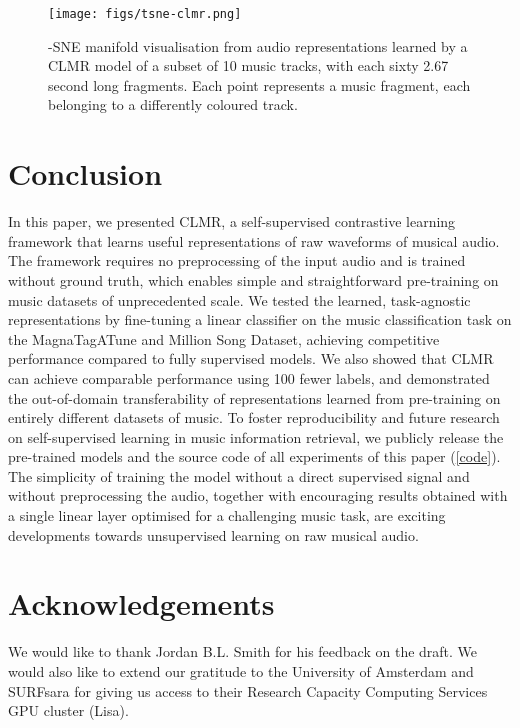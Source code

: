 \documentclass{article}
\begin{document}
 

\begin{figure}[t]
    \centering
    \texttt{[image: figs/tsne-clmr.png]}
    \caption{-SNE manifold visualisation from audio representations learned by a CLMR model of a subset of 10 music tracks, with each sixty 2.67 second long fragments.
    Each point represents a music fragment, each belonging to a differently coloured track.}
    \label{fig:tsne_manifold}
\end{figure}

\section{Conclusion}\label{sec:conclusion}
In this paper, we presented CLMR, a self-supervised contrastive learning framework that learns useful representations of raw waveforms of musical audio.
The framework requires no preprocessing of the input audio and is trained without ground truth, which enables simple and straightforward pre-training on music datasets of unprecedented scale.
We tested the learned, task-agnostic representations by fine-tuning a linear classifier on the music classification task on the Magna\-Tag\-A\-Tune and Million Song Dataset, achieving competitive performance compared to fully supervised models.
We also showed that CLMR can achieve comparable performance using 100 fewer labels, and demonstrated the out-of-domain transferability of representations learned from pre-training on entirely different datasets of music.
To foster reproducibility and future research on self-supervised learning in music information retrieval, we publicly release the pre-trained models and the source code of all experiments of this paper (\ref{code}).
The simplicity of training the model without a direct supervised signal and without preprocessing the audio, together with encouraging results obtained with a single linear layer optimised for a challenging music task, are exciting developments towards unsupervised learning on raw musical audio.
\newpage
 \section*{Acknowledgements}
We would like to thank Jordan B.L. Smith for his feedback on the draft. We would also like to extend our gratitude to the University of Amsterdam and SURFsara for giving us access to their Research Capacity Computing Services GPU cluster (Lisa). 



\cleardoublepage
\appendix
{}
\onecolumn
\end{document}
